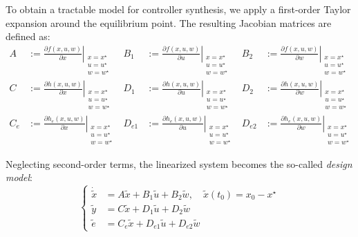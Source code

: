 \documentclass[]{report}
\begin{document}
To obtain a tractable model for controller synthesis, we apply a first-order Taylor expansion around the equilibrium point. The resulting Jacobian matrices are defined as:
\begin{equation}
	\label{eq:jacobians_compact_matrix}
	\begin{aligned}
		A &:= \left. \frac{\partial f(x, u, w)}{\partial x} \right|_{\substack{x = x^\star \\ u = u^\star \\ w = w^\star}} & B_1 &:= \left. \frac{\partial f(x, u, w)}{\partial u} \right|_{\substack{x = x^\star \\ u = u^\star \\ w = w^\star}} & B_2 &:= \left. \frac{\partial f(x, u, w)}{\partial w} \right|_{\substack{x = x^\star \\ u = u^\star \\ w = w^\star}} \\
		C &:= \left. \frac{\partial h(x, u, w)}{\partial x} \right|_{\substack{x = x^\star \\ u = u^\star \\ w = w^\star}} & D_1 &:= \left. \frac{\partial h(x, u, w)}{\partial u} \right|_{\substack{x = x^\star \\ u = u^\star \\ w = w^\star}} & D_2 &:= \left. \frac{\partial h(x, u, w)}{\partial w} \right|_{\substack{x = x^\star \\ u = u^\star \\ w = w^\star}} \\
		C_e &:= \left. \frac{\partial h_e(x, u, w)}{\partial x} \right|_{\substack{x = x^\star \\ u = u^\star \\ w = w^\star}} & D_{e1} &:= \left. \frac{\partial h_e(x, u, w)}{\partial u} \right|_{\substack{x = x^\star \\ u = u^\star \\ w = w^\star}} & D_{e2} &:= \left. \frac{\partial h_e(x, u, w)}{\partial w} \right|_{\substack{x = x^\star \\ u = u^\star \\ w = w^\star}}
	\end{aligned}
\end{equation}





Neglecting second-order terms, the linearized system becomes the so-called \textit{design model}:
\begin{equation}
\label{eq:linearized_system}
\left\{
\begin{aligned}
	\dot{\tilde{x}} &= A \tilde{x} + B_1 \tilde{u} + B_2 \tilde{w}, \quad \tilde{x}(t_0) = x_0 - x^\star \\
	\tilde{y} &= C \tilde{x} + D_1 \tilde{u} + D_2 \tilde{w} \\
	\tilde{e} &= C_e \tilde{x} + D_{e1} \tilde{u} + D_{e2} \tilde{w}
\end{aligned}
\right.
\end{equation}
\end{document}
